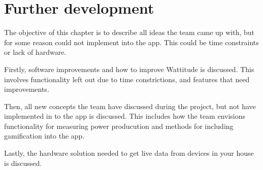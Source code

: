 \chapter{Further development}
\label{sec:further}

The objective of this chapter is to describe all ideas the team came up with, but for some reason could not implement into the app. This could be time constraints or lack of hardware. 

Firstly, software improvements and how to improve Wattitude is discussed. This involves functionality left out due to time constrictions, and features that need improvements. 

Then, all new concepts the team have discussed during the project, but not have implemented in to the app is discussed. This includes how the team envisions functionality for measuring power producution and methods for including gamification into the app. 

Lastly, the hardware solution needed to get live data from devices in your house is discussed. 




